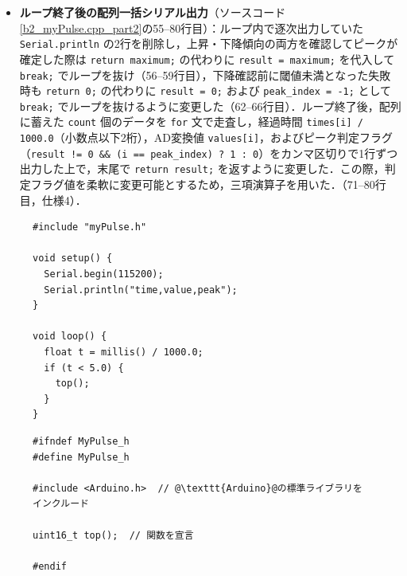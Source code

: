 \begin{itemize}
  \item \textbf{ループ終了後の配列一括シリアル出力}（ソースコード\ref{b2_myPulse.cpp_part2}の55--80行目）：ループ内で逐次出力していた \texttt{Serial.println} の2行を削除し，上昇・下降傾向の両方を確認してピークが確定した際は \texttt{return maximum;} の代わりに \texttt{result = maximum;} を代入して \texttt{break;} でループを抜け（56--59行目），下降確認前に閾値未満となった失敗時も \texttt{return 0;} の代わりに \texttt{result = 0;} および \texttt{peak\_index = -1;} として \texttt{break;} でループを抜けるように変更した（62--66行目）．ループ終了後，配列に蓄えた \texttt{count} 個のデータを \texttt{for} 文で走査し，経過時間 \texttt{times[i] / 1000.0}（小数点以下2桁），AD変換値 \texttt{values[i]}，およびピーク判定フラグ（\texttt{result != 0 \&\& (i == peak\_index) ? 1 : 0}）をカンマ区切りで1行ずつ出力した上で，末尾で \texttt{return result;} を返すように変更した．この際，判定フラグ値を柔軟に変更可能とするため，三項演算子を用いた．（71--80行目，仕様4）．
\end{itemize}

\begin{figure}[H]
  \begin{lstlisting}[caption=b2\_peak\_detection.ino, label=b2_peak_detection, escapechar=\@]
#include "myPulse.h"

void setup() {
  Serial.begin(115200);
  Serial.println("time,value,peak");
}

void loop() {
  float t = millis() / 1000.0;
  if (t < 5.0) {
    top();
  }
}
    \end{lstlisting}
\end{figure}

\begin{figure}[H]
  \begin{lstlisting}[caption=myPulse.h, label=b2_myPulse.h, escapechar=\@]
#ifndef MyPulse_h
#define MyPulse_h

#include <Arduino.h>  // @\texttt{Arduino}@の標準ライブラリをインクルード

uint16_t top();  // 関数を宣言

#endif
    \end{lstlisting}
\end{figure}

